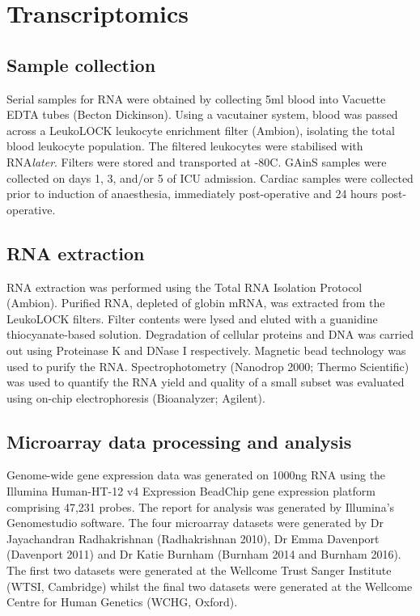 \section{Transcriptomics}
\subsection{Sample collection}
Serial samples for RNA were obtained by collecting 5ml blood into Vacuette EDTA tubes (Becton Dickinson). Using a vacutainer system, blood was passed across a LeukoLOCK leukocyte enrichment filter (Ambion), isolating the total blood leukocyte population. The filtered leukocytes were stabilised with RNA\textit{later}. Filters were stored and transported at -80\degree C. GAinS samples were collected on days 1, 3, and/or 5 of ICU admission. Cardiac samples were collected prior to induction of anaesthesia, immediately post-operative and 24 hours post-operative.

\subsection{RNA extraction}
RNA extraction was performed using the Total RNA Isolation Protocol (Ambion). Purified RNA, depleted of globin mRNA, was extracted from the LeukoLOCK filters. Filter contents were lysed and eluted with a guanidine thiocyanate-based solution. Degradation of cellular proteins and DNA was carried out using Proteinase K and DNase I respectively. Magnetic bead technology was used to purify the RNA. Spectrophotometry (Nanodrop 2000; Thermo Scientific) was used to quantify the RNA yield and quality of a small subset was evaluated using on-chip electrophoresis (Bioanalyzer; Agilent).

\subsection{Microarray data processing and analysis}
Genome-wide gene expression data was generated on 1000ng RNA using the Illumina Human-HT-12 v4 Expression BeadChip gene expression platform comprising 47,231 probes. The report for analysis was generated by Illumina's Genomestudio software. The four microarray datasets were generated by Dr Jayachandran Radhakrishnan (Radhakrishnan 2010), Dr Emma Davenport (Davenport 2011) and Dr Katie Burnham (Burnham 2014 and Burnham 2016). The first two datasets were generated at the Wellcome Trust Sanger Institute (WTSI, Cambridge) whilst the final two datasets were generated at the Wellcome Centre for Human Genetics (WCHG, Oxford).

